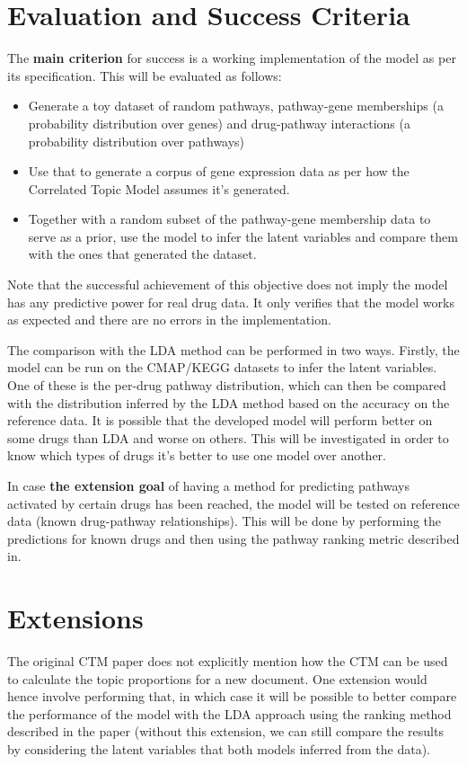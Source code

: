 \documentclass[12pt,a4]{article}
\begin{document}
\section*{Evaluation and Success Criteria}

The \textbf{main criterion} for success is a working implementation of the model as per its specification. This will be evaluated as follows:
\begin{itemize} 
\item Generate a toy dataset of random pathways, pathway-gene memberships (a probability distribution over genes) and drug-pathway interactions (a probability distribution over pathways)
\item Use that to generate a corpus of gene expression data as per how the Correlated Topic Model assumes it's generated.
\item Together with a random subset of the pathway-gene membership data to serve as a prior, use the model to infer the latent variables and compare them with the ones that generated the dataset.
\end{itemize}

Note that the successful achievement of this objective does not imply the model has any predictive power for real drug data. It only verifies that the model works as expected and there are no errors in the implementation.

The comparison with the LDA method can be performed in two ways. Firstly, the model can be run on the CMAP/KEGG datasets to infer the latent variables. One of these is the per-drug pathway distribution, which can then be compared with the distribution inferred by the LDA method based on the accuracy on the reference data. It is possible that the developed model will perform better on some drugs than LDA and worse on others. This will be investigated in order to know which types of drugs it's better to use one model over another.

In case \textbf{the extension goal} of having a method for predicting pathways activated by certain drugs has been reached, the model will be tested on reference data (known drug-pathway relationships). This will be done by performing the predictions for known drugs and then using the pathway ranking metric described in\cite{Pratanwanich2014}.


\section*{Extensions}
The original CTM paper does not explicitly mention how the CTM can be used to calculate the topic proportions for a new document. One extension would hence involve performing that, in which case it will be possible to better compare the performance of the model with the LDA approach using the ranking method described in the paper\cite{Pratanwanich2014} (without this extension, we can still compare the results by considering the latent variables that both models inferred from the data).
\end{document}
